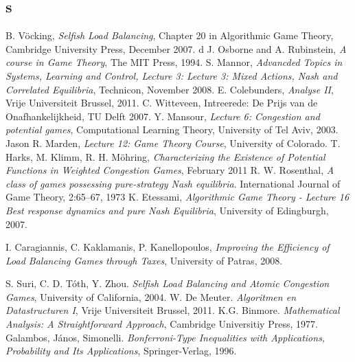 \documentclass[a4paper,11pt]{article}
\begin{document}
\subsection{s}
\newpage
\begin{thebibliography}{99}
 B. V\"{o}cking, \emph{Selfish Load Balancing}, Chapter 20 in Algorithmic Game Theory, Cambridge University Press, December 2007.
 d J. Osborne and A. Rubinstein, \emph{A course in Game Theory},  The MIT Press, 1994.
 S. Mannor, \emph{Advancded Topics in Systems, Learning and Control, Lecture 3: Lecture 3: Mixed Actions, Nash and Correlated Equilibria}, Technicon, November 2008.
 E. Colebunders, \emph{Analyse II}, Vrije Universiteit Brussel, 2011.
 C. Witteveen, Intreerede: De Prijs van de Onafhankelijkheid, TU Delft 2007.
 Y. Mansour, \emph{Lecture 6: Congestion and potential games}, Computational Learning Theory, University of Tel Aviv, 2003.
 Jason R. Marden, \emph{Lecture 12: Game Theory Course}, University of Colorado.
 T. Harks, M. Klimm, R. H. M\"{o}hring, \emph{Characterizing the Existence of Potential Functions in Weighted Congestion Games}, February 2011
 R. W. Rosenthal, \emph{ A class of games possessing pure-strategy Nash equilibria}. International Journal of Game Theory, 2:65–67, 1973
 K. Etessami, \emph{Algorithmic Game Theory - Lecture 16 Best response dynamics and pure Nash Equilibria}, University of Edingburgh, 2007.

 I. Caragiannis, C. Kaklamanis, P. Kanellopoulos, \emph{Improving the Efficiency of Load Balancing Games through Taxes}, University of Patras, 2008.

 S. Suri, C. D. T\'{o}th, Y. Zhou. \emph{Selfish Load Balancing and Atomic Congestion Games}, University of California, 2004.
 W. De Meuter. \emph{Algoritmen en Datastructuren I}, Vrije Universiteit Brussel, 2011.
 K.G. Binmore. \emph{Mathematical Analysis: A Straightforward Approach}, Cambridge Universitiy Press, 1977.
 Galambos, J\'{a}nos, Simonelli. \emph{Bonferroni-Type Inequalities with Applications, Probability and Its Applications}, Springer-Verlag, 1996.
    \end{thebibliography}
\end{document}
